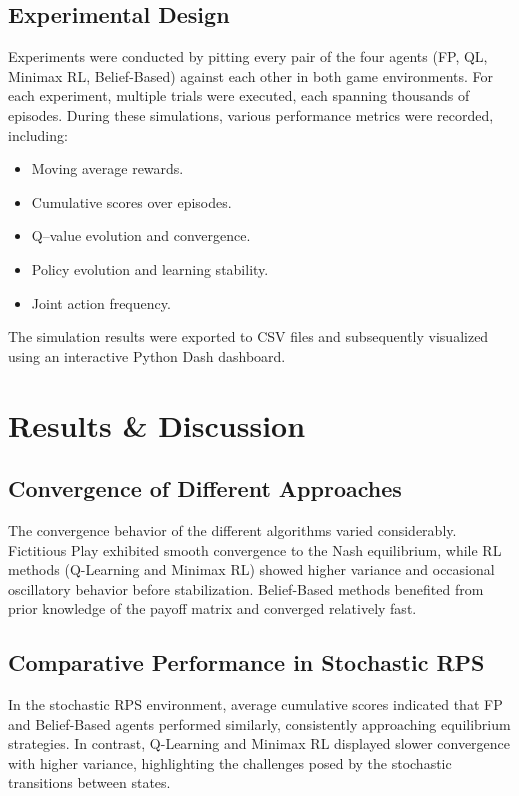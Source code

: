 \documentclass[11pt]{article}
\begin{document}
\subsection{Experimental Design}
Experiments were conducted by pitting every pair of the four agents (FP, QL, Minimax RL, Belief-Based) against each other in both game environments. For each experiment, multiple trials were executed, each spanning thousands of episodes. During these simulations, various performance metrics were recorded, including:
\begin{itemize}
    \item Moving average rewards.
    \item Cumulative scores over episodes.
    \item Q–value evolution and convergence.
    \item Policy evolution and learning stability.
    \item Joint action frequency.
\end{itemize}
The simulation results were exported to CSV files and subsequently visualized using an interactive Python Dash dashboard.

\section{Results \& Discussion}

\subsection{Convergence of Different Approaches}
The convergence behavior of the different algorithms varied considerably. Fictitious Play exhibited smooth convergence to the Nash equilibrium, while RL methods (Q-Learning and Minimax RL) showed higher variance and occasional oscillatory behavior before stabilization. Belief-Based methods benefited from prior knowledge of the payoff matrix and converged relatively fast.

\subsection{Comparative Performance in Stochastic RPS}
In the stochastic RPS environment, average cumulative scores indicated that FP and Belief-Based agents performed similarly, consistently approaching equilibrium strategies. In contrast, Q-Learning and Minimax RL displayed slower convergence with higher variance, highlighting the challenges posed by the stochastic transitions between states.
\end{document}
